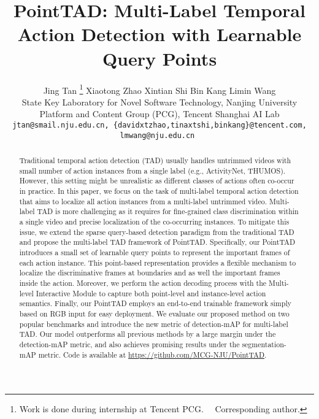 \documentclass{article}
\title{PointTAD: Multi-Label Temporal Action Detection with Learnable Query Points}
\author{Jing Tan \thanks{Work is done during internship at Tencent PCG. ~~\textsuperscript{\dag}Corresponding author. } \quad
Xiaotong Zhao  \quad
Xintian Shi  \quad
Bin Kang  \quad
Limin Wang \vspace{0.2em}\\
State Key Laboratory for Novel Software Technology, Nanjing University \\ Platform and Content Group (PCG), Tencent \quad \quad Shanghai AI Lab \vspace{.2em}\\
{\tt\small{jtan@smail.nju.edu.cn,  \{davidxtzhao,tinaxtshi,binkang\}@tencent.com, lmwang@nju.edu.cn }}
}
\begin{document}
\maketitle


\begin{abstract}
  Traditional temporal action detection (TAD) usually handles untrimmed videos with small number of action instances from a single label (e.g., ActivityNet, THUMOS). However, this setting might be unrealistic as different classes of actions often co-occur in practice. 
  In this paper, we focus on the task of multi-label temporal action detection that aims to localize all action instances from a multi-label untrimmed video. 
  Multi-label TAD is more challenging as it requires for fine-grained class discrimination within a single video and precise localization of the co-occurring instances. 
  To mitigate this issue, we extend the sparse query-based detection paradigm from the traditional TAD and propose the multi-label TAD framework of PointTAD. 
  Specifically, our PointTAD introduces a small set of learnable query points to represent the important frames of each action instance. This point-based representation provides a flexible mechanism to localize the discriminative frames at boundaries and as well the important frames inside the action.
  Moreover, we perform the action decoding process with the Multi-level Interactive Module to capture both point-level and instance-level action semantics. Finally, our PointTAD employs an end-to-end trainable framework simply based on RGB input for easy deployment. We evaluate our proposed method on two popular benchmarks and introduce the new metric of detection-mAP for multi-label TAD. Our model outperforms all previous methods by a large margin under the detection-mAP metric, and also achieves promising results under the segmentation-mAP metric.
  Code is available at \href{https://github.com/MCG-NJU/PointTAD}{https://github.com/MCG-NJU/PointTAD}.
\end{abstract}
\end{document}
